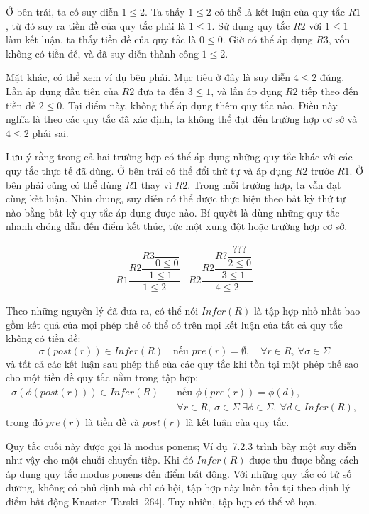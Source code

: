 Ở bên trái, ta cố suy diễn $1\leqslant2$. Ta thấy $1\leqslant2$ có thể là kết luận của quy tắc $R1$, từ đó suy ra tiền đề của quy tắc phải là $1\leqslant1$. Sử dụng quy tắc $R2$ với $1\leqslant1$ làm kết luận, ta thấy tiền đề của quy tắc là $0\leqslant0$. Giờ có thể áp dụng $R3$, vốn không có tiền đề, và đã suy diễn thành công $1\leqslant2$.

Mặt khác, có thể xem ví dụ bên phải. Mục tiêu ở đây là suy diễn $4\leqslant2$ đúng. Lần áp dụng đầu tiên của $R2$ đưa ta đến $3\leqslant1$, và lần áp dụng $R2$ tiếp theo đến tiền đề $2\leqslant0$. Tại điểm này, không thể áp dụng thêm quy tắc nào. Điều này nghĩa là theo các quy tắc đã xác định, ta không thể đạt đến trường hợp cơ sở và $4\leqslant2$ phải sai.

Lưu ý rằng trong cả hai trường hợp có thể áp dụng những quy tắc khác với các quy tắc thực tế đã dùng. Ở bên trái có thể đổi thứ tự và áp dụng $R2$ trước $R1$. Ở bên phải cũng có thể dùng $R1$ thay vì $R2$. Trong mỗi trường hợp, ta vẫn đạt cùng kết luận. Nhìn chung, suy diễn có thể được thực hiện theo bất kỳ thứ tự nào bằng bất kỳ quy tắc áp dụng được nào. Bí quyết là dùng những quy tắc nhanh chóng dẫn đến điểm kết thúc, tức một xung đột hoặc trường hợp cơ sở.

\[
\begin{array}{cc}
R1\dfrac{R2\dfrac{R3\dfrac{}{0\leqslant0}}{1\leqslant1}}{1\leqslant2}
&
R2\dfrac{R2\dfrac{R?\dfrac{???}{2\leqslant0}}{3\leqslant1}}{4\leqslant2}
\end{array}
\]

Theo những nguyên lý đã đưa ra, có thể nói $Infer(R)$ là tập hợp nhỏ nhất bao gồm kết quả của mọi phép thế có thể có trên mọi kết luận của tất cả quy tắc không có tiền đề:
\[
\sigma(post(r))\in Infer(R)\quad\text{nếu }pre(r)=\emptyset,\quad\forall r\in R,\ \forall\sigma\in\Sigma
\]
và tất cả các kết luận sau phép thế của các quy tắc khi tồn tại một phép thế sao cho một tiền đề quy tắc nằm trong tập hợp:
\[
\begin{aligned}
\sigma(\phi(post(r)))\in Infer(R)\quad&\text{nếu }\phi(pre(r))=\phi(d),\\
&\forall r\in R,\ \sigma\in\Sigma\ \exists\phi\in\Sigma,\ \forall d\in Infer(R),
\end{aligned}
\]
trong đó $pre(r)$ là tiền đề và $post(r)$ là kết luận của quy tắc.

Quy tắc cuối này được gọi là modus ponens; Ví dụ~7.2.3 trình bày một suy diễn như vậy cho một chuỗi chuyển tiếp. Khi đó $Infer(R)$ được thu được bằng cách áp dụng quy tắc modus ponens đến điểm bất động. Với những quy tắc có tử số dương, không có phủ định mà chỉ có hội, tập hợp này luôn tồn tại theo định lý điểm bất động Knaster--Tarski [264]. Tuy nhiên, tập hợp có thể vô hạn.

